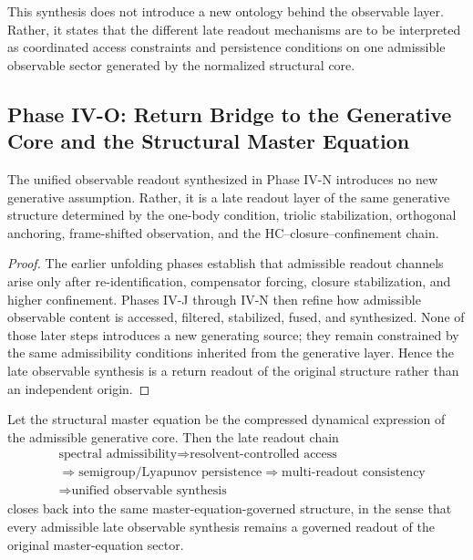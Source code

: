 \begin{remark}
This synthesis does not introduce a new ontology behind the observable layer. Rather, it states that the different late readout mechanisms are to be interpreted as coordinated access constraints and persistence conditions on one admissible observable sector generated by the normalized structural core.
\end{remark}



\subsection*{Phase IV-O: Return Bridge to the Generative Core and the Structural Master Equation}

\begin{proposition}\label{prop:return_bridge_unified_readout}
The unified observable readout synthesized in Phase IV-N introduces no new generative assumption. Rather, it is a late readout layer of the same generative structure determined by the one-body condition, triolic stabilization, orthogonal anchoring, frame-shifted observation, and the HC--closure--confinement chain.
\end{proposition}

\begin{proof}
The earlier unfolding phases establish that admissible readout channels arise only after re-identification, compensator forcing, closure stabilization, and higher confinement. Phases IV-J through IV-N then refine how admissible observable content is accessed, filtered, stabilized, fused, and synthesized. None of those later steps introduces a new generating source; they remain constrained by the same admissibility conditions inherited from the generative layer. Hence the late observable synthesis is a return readout of the original structure rather than an independent origin.
\end{proof}

\begin{theorem}\label{thm:master_equation_readout_closure}
Let the structural master equation be the compressed dynamical expression of the admissible generative core. Then the late readout chain
\[
\begin{aligned}
&\text{spectral admissibility}
\Longrightarrow \text{resolvent-controlled access}
\\
&\Longrightarrow \text{semigroup/Lyapunov persistence}
\Longrightarrow \text{multi-readout consistency}
\\
&\Longrightarrow \text{unified observable synthesis}
\end{aligned}
\]
closes back into the same master-equation-governed structure, in the sense that every admissible late observable synthesis remains a governed readout of the original master-equation sector.
\end{theorem}

